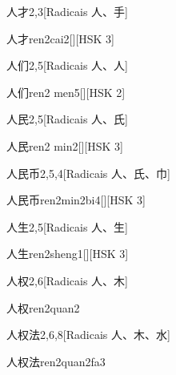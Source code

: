 \begin{entry}{人才}{2,3}[Radicais ⼈、⼿]
  \begin{phonetics}{人才}{ren2cai2}[][HSK 3]
  \end{phonetics}
\end{entry}

\begin{entry}{人们}{2,5}[Radicais ⼈、⼈]
  \begin{phonetics}{人们}{ren2 men5}[][HSK 2]
  \end{phonetics}
\end{entry}

\begin{entry}{人民}{2,5}[Radicais ⼈、⽒]
  \begin{phonetics}{人民}{ren2 min2}[][HSK 3]
  \end{phonetics}
\end{entry}

\begin{entry}{人民币}{2,5,4}[Radicais ⼈、⽒、⼱]
  \begin{phonetics}{人民币}{ren2min2bi4}[][HSK 3]
  \end{phonetics}
\end{entry}

\begin{entry}{人生}{2,5}[Radicais ⼈、⽣]
  \begin{phonetics}{人生}{ren2sheng1}[][HSK 3]
  \end{phonetics}
\end{entry}

\begin{entry}{人权}{2,6}[Radicais ⼈、⽊]
  \begin{phonetics}{人权}{ren2quan2}
  \end{phonetics}
\end{entry}

\begin{entry}{人权法}{2,6,8}[Radicais ⼈、⽊、⽔]
  \begin{phonetics}{人权法}{ren2quan2fa3}
  \end{phonetics}
\end{entry}

